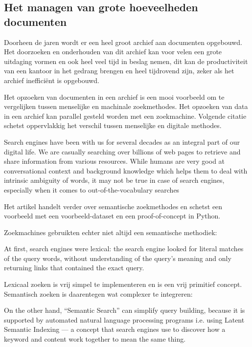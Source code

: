 \subsection{Het managen van grote hoeveelheden documenten}
Doorheen de jaren wordt er een heel groot archief aan documenten opgebouwd.
Het doorzoeken en onderhouden van dit archief kan voor velen een grote uitdaging vormen en ook heel veel tijd in beslag nemen,
dit kan de productiviteit van een kantoor in het gedrang brengen en heel tijdrovend zijn, zeker als het archief inefficiënt is opgebouwd.

Het opzoeken van documenten in een archief is een mooi voorbeeld om te vergelijken tussen menselijke en machinale zoekmethodes.
Het opzoeken van data in een archief kan parallel gesteld worden met een zoekmachine. Volgende citatie schetst oppervlakkig het verschil tussen
menselijke en digitale methodes.

\begin{displayquote}
	Search engines have been with us for several decades as an integral part of our digital life.
	We are casually searching over billions of web pages to retrieve and share information from various resources.
	While humans are very good at conversational context and background knowledge which helps them to deal with intrinsic ambiguity of words,
	it may not be true in case of search engines, especially when it comes to out-of-the-vocabulary searches \autocite{MediumSemanticSearch}
\end{displayquote}

Het artikel handelt verder over semantische zoekmethodes en schetst een voorbeeld met een voorbeeld-dataset en een proof-of-concept in Python.

Zoekmachines gebruikten echter niet altijd een semantische methodiek:

\begin{displayquote}
	At first, search engines were lexical: the search engine looked for literal matches of the query words,
	without understanding of the query’s meaning and only returning links that contained the exact query. \autocite{MediumSemanticSearch}
\end{displayquote}

Lexicaal zoeken is vrij simpel te implementeren en is een vrij primitief concept. Semantisch zoeken is daarentegen wat complexer te integreren:

\begin{displayquote}
	On the other hand, “Semantic Search” can simplify query building, because it is supported by automated natural language processing programs
	i.e. using Latent Semantic Indexing — a concept that search engines use to discover how a keyword and content work together to mean the same thing. \autocite{MediumSemanticSearch}
\end{displayquote}

